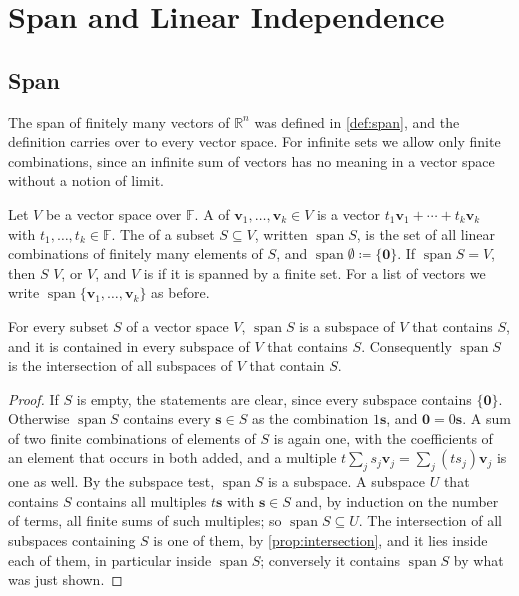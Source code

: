 \section{Span and Linear Independence}
\label{sec:independence}

\subsection{Span}

The span of finitely many vectors of $\mathbb R^n$ was defined in \cref{def:span}, and the definition carries over to every vector space. For infinite sets we allow only finite combinations, since an infinite sum of vectors has no meaning in a vector space without a notion of limit.

\begin{definition}
\label{def:span-general}
Let $V$ be a vector space over $\mathbb F$. A  of $\mathbf v_1,\ldots,\mathbf v_k\in V$ is a vector $t_1\mathbf v_1+\cdots+t_k\mathbf v_k$ with $t_1,\ldots,t_k\in\mathbb F$. The  of a subset $S\subseteq V$, written $\operatorname{span}S$, is the set of all linear combinations of finitely many elements of $S$, and $\operatorname{span}\emptyset\coloneqq\{\mathbf 0\}$. If $\operatorname{span}S=V$, then $S$  $V$, or  $V$, and $V$ is  if it is spanned by a finite set. For a list of vectors we write $\operatorname{span}\{\mathbf v_1,\ldots,\mathbf v_k\}$ as before.
\end{definition}

\begin{proposition}
\label{prop:span-smallest}
For every subset $S$ of a vector space $V$, $\operatorname{span}S$ is a subspace of $V$ that contains $S$, and it is contained in every subspace of $V$ that contains $S$. Consequently $\operatorname{span}S$ is the intersection of all subspaces of $V$ that contain $S$.
\end{proposition}

\begin{proof}
If $S$ is empty, the statements are clear, since every subspace contains $\{\mathbf 0\}$. Otherwise $\operatorname{span}S$ contains every $\mathbf s\in S$ as the combination $1\mathbf s$, and $\mathbf 0=0\mathbf s$. A sum of two finite combinations of elements of $S$ is again one, with the coefficients of an element that occurs in both added, and a multiple $t\sum_js_j\mathbf v_j=\sum_j(ts_j)\mathbf v_j$ is one as well. By the subspace test, $\operatorname{span}S$ is a subspace. A subspace $U$ that contains $S$ contains all multiples $t\mathbf s$ with $\mathbf s\in S$ and, by induction on the number of terms, all finite sums of such multiples; so $\operatorname{span}S\subseteq U$. The intersection of all subspaces containing $S$ is one of them, by \cref{prop:intersection}, and it lies inside each of them, in particular inside $\operatorname{span}S$; conversely it contains $\operatorname{span}S$ by what was just shown.
\end{proof}

